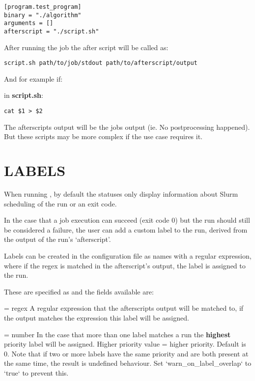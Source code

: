 \documentclass[a4paper,english]{article}
\begin{document}
\begin{adjustwidth}{18pt}{0pt}
            \begin{verbatim}
[program.test_program]
binary = "./algorithm"
arguments = []
afterscript = "./script.sh"
            \end{verbatim}

            After running the job the after script will be called as:

            \begin{verbatim}
script.sh path/to/job/stdout path/to/afterscript/output
            \end{verbatim}

            And for example if:

            in \textbf{script.sh}:
            \begin{verbatim}
cat $1 > $2
            \end{verbatim}

            The afterscripts output will be the jobs output (ie. No postprocessing happened).
            But these scripts may be more complex if the use case requires it.

    \section{LABELS}

      When running  , by default the statuses only display information
      about Slurm scheduling of the run or an exit code.

      In the case that a job execution can succeed (exit code 0) but the run should still
      be considered a failure, the user can add a custom label to the run, derived from
      the output of the run's `afterscript'.

      Labels can be created in the configuration file as names with a regular expression,
      where if the regex is matched in the afterscript's output, the label is assigned to the run.

      These are specified as  and the fields available are:

      \begin{Description}[Options]\setlength{\itemsep}{0cm}
          \item[\Opt{regex} = regex]
          A regular expression that the afterscripts output will be matched to,
          if the output matches the expression this label will be assigned.

          \item[\Opt{priority} = number]
          In the case that more than one label matches a run the \textbf{highest}
          priority label will be assigned.
          Higher priority value = higher priority.
          Default is 0. 
          Note that if two or more labels have the same priority and are both present 
          at the same time, the result is undefined behaviour. 
          Set `warn\_on\_label\_overlap` to `true` to prevent this.


\end{Description}
\end{adjustwidth}
\end{document}
